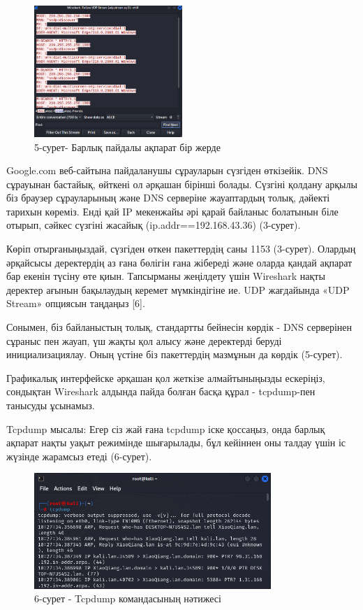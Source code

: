 \begin{figure}[H]
	\centering
	\includegraphics[width=0.5\textwidth]{assets/29}
	\caption*{5-сурет- Барлық пайдалы ақпарат бір жерде}
\end{figure}

\begin{multicols}{2}
Google.com веб-сайтына пайдаланушы сұрауларын сүзгіден өткізейік. DNS
сұрауынан бастайық, өйткені ол әрқашан бірінші болады. Сүзгіні қолдану
арқылы біз браузер сұрауларының және DNS серверіне жауаптардың толық,
дәйекті тарихын көреміз. Енді қай IP мекенжайы әрі қарай байланыс
болатынын біле отырып, сәйкес сүзгіні жасайық (ip.addr==192.168.43.36)
(3-сурет).

Көріп отырғаныңыздай, сүзгіден өткен пакеттердің саны 1153 (3-сурет).
Олардың әрқайсысы деректердің аз ғана бөлігін ғана жібереді және оларда
қандай ақпарат бар екенін түсіну өте қиын. Тапсырманы жеңілдету үшін
Wireshark нақты деректер ағынын бақылаудың керемет мүмкіндігіне ие. UDP
жағдайында «UDP Stream» опциясын таңдаңыз {[}6{]}.

Сонымен, біз байланыстың толық, стандартты бейнесін көрдік - DNS
серверінен сұраныс пен жауап, үш жақты қол алысу және деректерді беруді
инициализациялау. Оның үстіне біз пакеттердің мазмұнын да көрдік
(5-сурет).

Графикалық интерфейске әрқашан қол жеткізе алмайтыныңызды ескеріңіз,
сондықтан Wireshark алдында пайда болған басқа құрал - tcpdump-пен
танысуды ұсынамыз.

Tcpdump мысалы: Егер сіз жай ғана tcpdump іске қоссаңыз, онда барлық
ақпарат нақты уақыт режимінде шығарылады, бұл кейіннен оны талдау үшін
іс жүзінде жарамсыз етеді (6-сурет).
\end{multicols}

\begin{figure}[H]
	\centering
	\includegraphics[width=0.8\textwidth]{assets/30}
	\caption*{6-сурет - Tcpdump командасының нәтижесі}
\end{figure}

